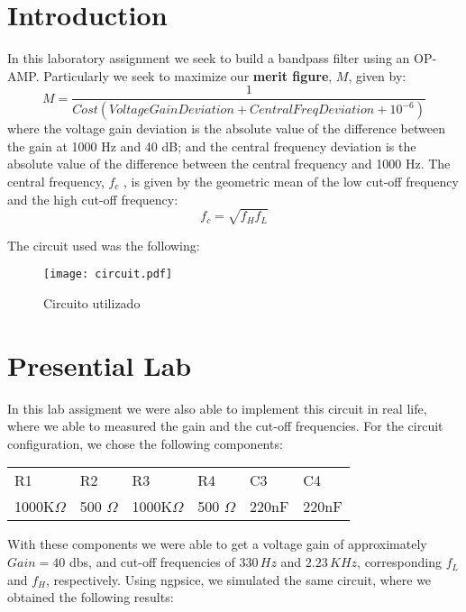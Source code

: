 \section{Introduction}
\label{sec:introduction}

In this laboratory assignment we seek to build a bandpass filter using an OP-AMP. Particularly we seek to maximize our \textbf{merit figure}, $M$, given by:
\begin{equation*}
    M = \frac{1}{Cost(VoltageGainDeviation+CentralFreqDeviation+10^{-6})}
\end{equation*}
where the voltage gain deviation is the absolute value of the difference between the gain at 1000 Hz and 40 dB; and the central frequency deviation is the absolute value of the difference between the central frequency and 1000 Hz. The central frequency, $f_c$ , is given by the geometric mean of the low cut-off frequency and the high cut-off frequency:
\begin{equation*}
    f_c = \sqrt{f_H f_L} 
\end{equation*}

The circuit used was the following:


\begin{figure}[H] \centering
\texttt{[image: circuit.pdf]}
\caption{Circuito utilizado}
\label{fig:circuit}
\end{figure}

\section{Presential Lab}

In this lab assigment we were also able to implement this circuit in real life, where we able to measured the gain and the cut-off frequencies.
For the circuit configuration, we chose the following components: 

\begin{table}[H]
\begin{tabular}{l|l|l|l|l|l|}
R1 & R2 & R3 & R4  & C3 & C4                         \\ 
1000K$\Omega$ & 500 $\Omega$ & 1000K$\Omega$ & 500 $\Omega$ & 220nF & 220nF \\ 
\end{tabular}
\end{table}

With these components we were able to get a voltage gain of approximately $Gain = 40$ dbs, and cut-off frequencies of $330\, Hz$ and $2.23\,KHz$, corresponding $f_L$ and $f_H$, respectively. 
Using ngpsice, we simulated the same circuit, where we obtained the following results:

